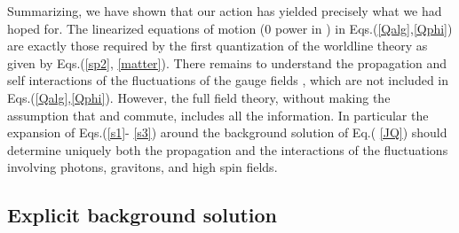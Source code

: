 \documentclass[a4paper,12pt]{article}
\begin{document}
Summarizing, we have shown that our action \coordHE{} has yielded
precisely what we had hoped for. The linearized equations of motion (0\coordHE{}
power in \coordHE{}) in Eqs.(\ref{Qalg},\ref{Qphi}) are exactly those required by
the first quantization of the worldline theory as given by Eqs.(\ref{sp2},%
\ref{matter}). There remains to understand the propagation and self
interactions of the fluctuations of the gauge fields \coordHE{}, which are not included
in Eqs.(\ref{Qalg},\ref{Qphi}). However, the full field theory, without
making the assumption that \coordHE{} and \coordHE{} commute,
includes all the information. In particular the expansion of Eqs.(\ref{s1}-%
\ref{s3}) around the background solution \coordHE{} of Eq.(%
\ref{JQ}) should determine uniquely both the propagation and the
interactions of the fluctuations involving photons, gravitons, and high spin
fields.

\subsection{Explicit background solution}
\end{document}
